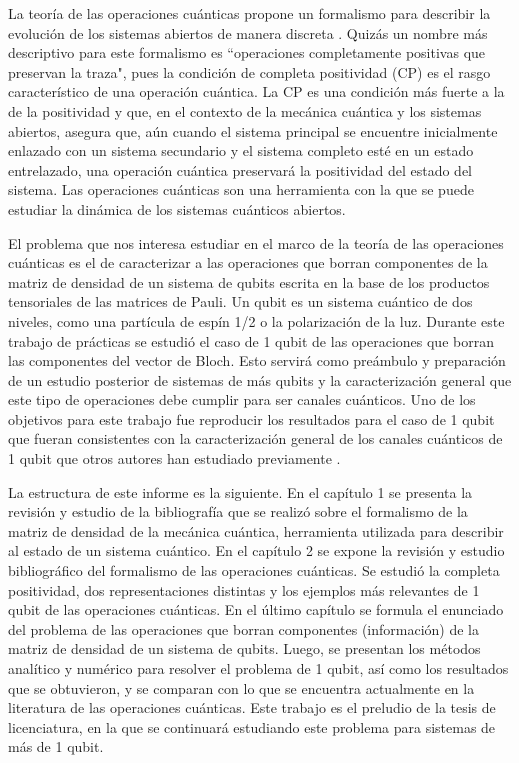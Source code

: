 La teoría de las operaciones cuánticas propone un formalismo para
describir la evolución de los sistemas abiertos de manera discreta
\cite{nielsen_chuang_2011}. 
Quizás un nombre más descriptivo para este formalismo es 
``operaciones completamente positivas que preservan la traza",
pues la condición de completa positividad (CP) es el rasgo característico 
de una operación cuántica. La CP es una condición más fuerte  
a la de la positividad y que, en el contexto de la
mecánica cuántica y los sistemas abiertos, asegura que, aún 
cuando el sistema principal se encuentre inicialmente enlazado 
con un sistema secundario y el sistema completo esté en 
un estado entrelazado, una operación cuántica preservará 
la positividad del estado del sistema. Las operaciones cuánticas son una herramienta
con la que se puede estudiar la dinámica de los 
sistemas cuánticos abiertos. 

El problema que nos interesa estudiar en el marco de la teoría de 
las operaciones cuánticas es el de caracterizar a las
operaciones que borran componentes de la matriz de densidad
de un sistema de qubits escrita en la base de los productos 
tensoriales de las matrices de Pauli. Un qubit es un sistema cuántico de dos niveles, 
como una partícula de espín 1/2 o la polarización de la luz. 
Durante este trabajo de prácticas se estudió el caso de 1 qubit de las 
operaciones que borran las componentes del vector de Bloch. Esto 
servirá como preámbulo y preparación de un estudio posterior 
de sistemas de más qubits y la caracterización general que este
tipo de operaciones debe cumplir para ser canales cuánticos.
Uno de los objetivos para este trabajo fue reproducir los
resultados para el caso de 1 qubit que fueran 
consistentes con la caracterización general de 
los canales cuánticos de 1 qubit que otros autores han 
estudiado previamente 
\cite{bengtsson_zyczkowski_2017,nielsen_chuang_2011}.

La estructura de este informe es la siguiente. En el capítulo 1
se presenta la revisión y estudio de la bibliografía que se realizó 
sobre el formalismo de la matriz de densidad de la mecánica cuántica, 
herramienta utilizada para describir 
al estado de un sistema cuántico. En el capítulo 2 se expone 
la revisión y estudio bibliográfico del formalismo de las 
operaciones cuánticas. Se estudió la completa positividad, 
dos representaciones distintas y los ejemplos más relevantes 
de 1 qubit de las operaciones cuánticas. En el último capítulo
se formula el enunciado del problema de las operaciones que borran 
componentes (información) de la matriz de densidad de un sistema de 
qubits. Luego, se presentan los métodos analítico y numérico 
para resolver el problema de 1 qubit, así como los resultados 
que se obtuvieron, y se comparan con lo que se encuentra actualmente
en la literatura de las operaciones cuánticas. Este trabajo 
es el preludio de la tesis de licenciatura, en la que se continuará 
estudiando este problema para sistemas de más de 1 qubit.


